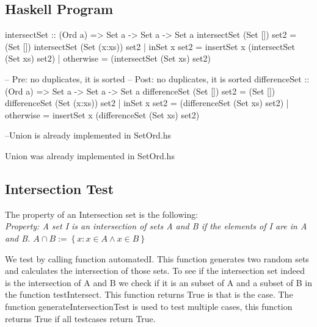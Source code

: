 \documentclass{article}
\begin{document}
\subsection*{Haskell Program}
\begin{code}
intersectSet :: (Ord a) => Set a -> Set a -> Set a 
intersectSet (Set [])     set2  =  (Set [])
intersectSet (Set (x:xs)) set2  | inSet x set2 = insertSet x (intersectSet (Set xs) set2)
                                | otherwise = (intersectSet (Set xs) set2)

-- Pre: no duplicates, it is sorted
-- Post: no duplicates, it is sorted 
differenceSet :: (Ord a) => Set a -> Set a -> Set a
differenceSet (Set [])     set2  =  (Set [])
differenceSet (Set (x:xs)) set2  | inSet x set2 = (differenceSet (Set xs) set2)
                                 | otherwise = insertSet x (differenceSet (Set xs) set2)                             

--Union is already implemented in SetOrd.hs
\end{code}

Union was already implemented in SetOrd.hs\\

\subsection*{Intersection Test}
The property of an Intersection set is the following: \\
\emph{
Property: A set I is an intersection of sets A and B if the elements of I are in A and B.
$ A \cap B := \left\{ x: x \in A \land x \in B\right\} $ \\}

We test by calling function automatedI. This function generates two random sets and calculates the intersection of those sets. To see if the intersection set indeed is the intersection of A and B we check if it is an subset of A and a subset of B in the function testIntersect. This function returns True is that is the case. The function generateIntersectionTest is used to test multiple cases, this function returns True if all testcases return True.

\end{document}
